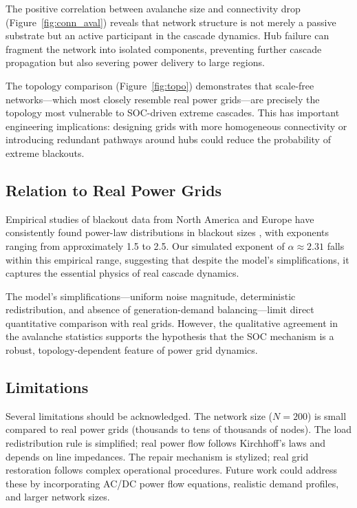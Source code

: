 \documentclass[12pt,a4paper]{article}
\begin{document}
The positive correlation between avalanche size and connectivity drop (Figure~\ref{fig:conn_aval}) reveals that network structure is not merely a passive substrate but an active participant in the cascade dynamics.
Hub failure can fragment the network into isolated components, preventing further cascade propagation but also severing power delivery to large regions.

The topology comparison (Figure~\ref{fig:topo}) demonstrates that scale-free networks---which most closely resemble real power grids---are precisely the topology most vulnerable to SOC-driven extreme cascades.
This has important engineering implications: designing grids with more homogeneous connectivity or introducing redundant pathways around hubs could reduce the probability of extreme blackouts.

\subsection{Relation to Real Power Grids}

Empirical studies of blackout data from North America and Europe have consistently found power-law distributions in blackout sizes \cite{carreras2004}, with exponents ranging from approximately 1.5 to 2.5.
Our simulated exponent of $\alpha \approx 2.31$ falls within this empirical range, suggesting that despite the model's simplifications, it captures the essential physics of real cascade dynamics.

The model's simplifications---uniform noise magnitude, deterministic redistribution, and absence of generation-demand balancing---limit direct quantitative comparison with real grids.
However, the qualitative agreement in the avalanche statistics supports the hypothesis that the SOC mechanism is a robust, topology-dependent feature of power grid dynamics.

\subsection{Limitations}

Several limitations should be acknowledged.
The network size ($N=200$) is small compared to real power grids (thousands to tens of thousands of nodes).
The load redistribution rule is simplified; real power flow follows Kirchhoff's laws and depends on line impedances.
The repair mechanism is stylized; real grid restoration follows complex operational procedures.
Future work could address these by incorporating AC/DC power flow equations, realistic demand profiles, and larger network sizes.
\end{document}
